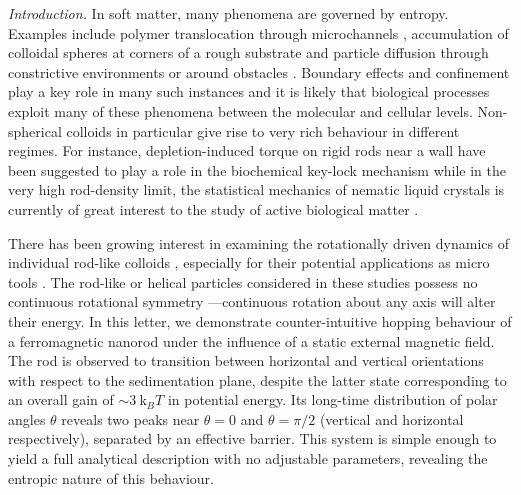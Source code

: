 \documentclass[aps,prl,twocolumn,superscriptaddress]{revtex4-1}
\newcommand{\kk}{\mathrm{k}_B}
\begin{document}
\pacs{}

\maketitle

%
%
%
%
%
%
%
\emph{Introduction.} In soft matter, many phenomena are governed by entropy. Examples include polymer translocation through microchannels \cite{Muthukumar1989,Ledesma-Aguilar2012}, accumulation of colloidal spheres at corners of a rough substrate \cite{Dinsmore1996} and particle diffusion through constrictive environments or around obstacles \cite{Chou1999,Zwanzig1992}. Boundary effects and confinement play a key role in many such instances and it is likely that biological processes exploit many of these phenomena between the molecular and cellular levels. Non-spherical colloids in particular give rise to very rich behaviour in different regimes. For instance, depletion-induced torque on rigid rods near a wall have been suggested to play a role in the biochemical key-lock mechanism \cite{Roth2002,Helden2003} while in the very high rod-density limit, the statistical mechanics of nematic liquid crystals is currently of great interest to the study of active biological matter \cite{Baskaran2009,Marchetti2013}.

There has been growing interest in examining the rotationally driven dynamics of individual rod-like colloids \cite{Dhar2007,Shelton2005,Ghosh2012}, especially for their potential applications as micro tools \cite{Solovev2012,Xi2013}. The rod-like or helical particles considered in these studies possess no continuous rotational symmetry ---continuous rotation about any axis will alter their energy. In this letter, we demonstrate counter-intuitive hopping behaviour of a ferromagnetic nanorod under the influence of a static external magnetic field. The rod is observed to transition between horizontal and vertical orientations with respect to the sedimentation plane, despite the latter state corresponding to an overall gain of $\sim3\ \kk T$ in potential energy. Its long-time distribution of polar angles $\theta$ reveals two peaks near $\theta=0$ and $\theta=\pi/2$ (vertical and horizontal respectively), separated by an effective barrier. This system is simple enough to yield a full analytical description with no adjustable parameters, revealing the entropic nature of this behaviour. 
\end{document}
